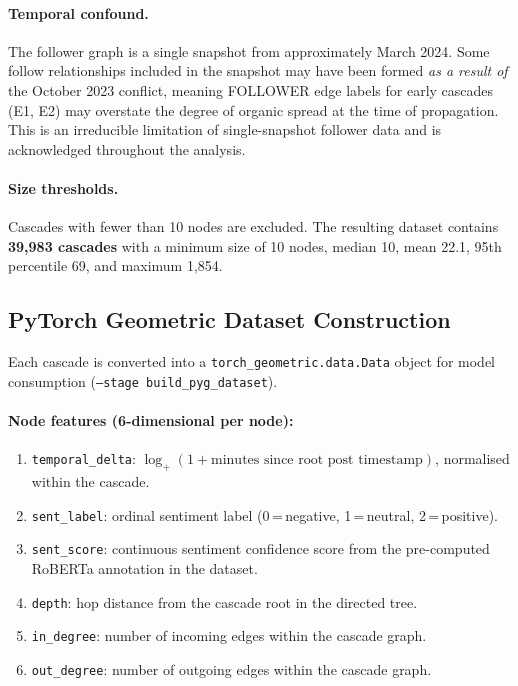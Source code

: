 \documentclass[12pt, a4paper]{article}
\begin{document}
\paragraph{Temporal confound.} The follower graph is a single snapshot from approximately March 2024. Some follow relationships included in the snapshot may have been formed \textit{as a result of} the October 2023 conflict, meaning FOLLOWER edge labels for early cascades (E1, E2) may overstate the degree of organic spread at the time of propagation. This is an irreducible limitation of single-snapshot follower data and is acknowledged throughout the analysis.

\paragraph{Size thresholds.} Cascades with fewer than 10 nodes are excluded. The resulting dataset contains \textbf{39,983 cascades} with a minimum size of 10 nodes, median 10, mean 22.1, 95th percentile 69, and maximum 1,854.

\subsection{PyTorch Geometric Dataset Construction}

Each cascade is converted into a \texttt{torch\_geometric.data.Data} object for model consumption (\texttt{--stage build\_pyg\_dataset}).

\paragraph{Node features (6-dimensional per node):}
\begin{enumerate}
  \item \texttt{temporal\_delta}: $\log_+(1+\text{minutes since root post timestamp})$, normalised within the cascade.
  \item \texttt{sent\_label}: ordinal sentiment label (0\,=\,negative, 1\,=\,neutral, 2\,=\,positive).
  \item \texttt{sent\_score}: continuous sentiment confidence score from the pre-computed RoBERTa annotation in the \citet{failla2024bluesky} dataset.
  \item \texttt{depth}: hop distance from the cascade root in the directed tree.
  \item \texttt{in\_degree}: number of incoming edges within the cascade graph.
  \item \texttt{out\_degree}: number of outgoing edges within the cascade graph.
\end{enumerate}
\end{document}
